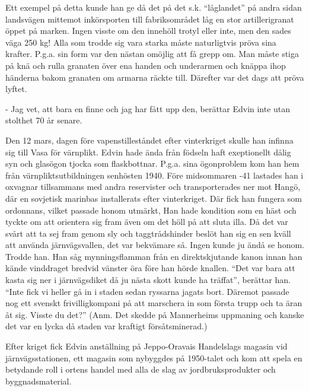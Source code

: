Ett exempel på detta kunde han ge då det på det s.k. ``låglandet'' på andra sidan landsvägen mittemot inkörsporten till fabriksområdet låg en stor artillerigranat öppet på marken. Ingen visste om den innehöll trotyl eller inte, men den sades väga 250 kg! Alla som trodde sig vara starka måste naturligtvis pröva sina krafter. P.g.a. sin form var den nästan omöjlig att få grepp om. Man måste stiga på knä och rulla granaten över ena handen och underarmen och knäppa ihop händerna bakom granaten om armarna räckte till. Därefter var det dags att pröva lyftet.

- Jag vet, att bara en finne och jag har fått upp den, berättar Edvin inte utan stolthet 70 år senare.

Den 12 mars, dagen före vapenstilleståndet efter vinterkriget skulle han infinna sig till Vasa för värnplikt. Edvin hade ända från födseln haft exeptionellt dålig syn och glasögon tjocka som flaskbottnar. P.g.a. sina ögonproblem kom han hem från värnpliktsutbildningen senhösten 1940. Före midsommaren -41 lastades han i oxvagnar tillsammans med andra reservister och transporterades ner mot Hangö, där en sovjetisk marinbas installerats efter vinterkriget. Där fick han fungera som ordonnans, vilket passade honom utmärkt, Han hade kondition som en häst och tyckte om att orientera sig fram även om det höll på att sluta illa. Då det var svårt att ta sej fram genom sly och taggtrådshinder beslöt han sig en sen kväll att använda järnvägsvallen, det var bekvämare så. Ingen kunde ju ändå se honom. Trodde han. Han såg mynningsflamman från en direktskjutande kanon innan han kände vinddraget bredvid vänster öra före han hörde knallen. ``Det var bara att kasta sig ner i järnvägsdiket då ju nästa skott kunde ha träffat'', berättar han. ``Inte fick vi heller gå in i staden sedan ryssarna jagats bort. Däremot passade nog ett svenskt frivilligkompani på att marschera in som första trupp och ta äran åt sig. Visste du det?''
(Anm. Det skedde på Mannerheims uppmaning och kanske det var en lycka då staden var kraftigt försåtsminerad.)

Efter kriget fick Edvin anställning på Jeppo-Oravais Handelslags magasin vid järnvägsstationen, ett magasin som nybyggdes på 1950-talet och kom att spela en betydande roll i ortens handel med alla de slag av jordbruksprodukter och byggnadsmaterial.

